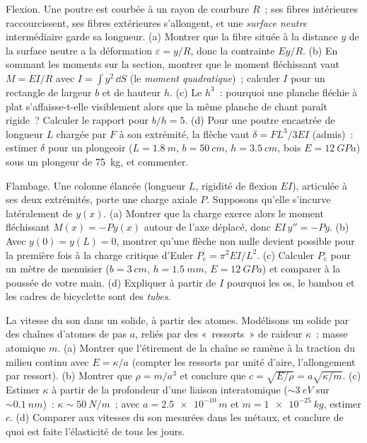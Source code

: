 \begin{exercise}[$\star\star\star$]\label{exo:b3:continuum-elasticity:10}
Flexion. Une poutre est courbée à un rayon de courbure $R$~; ses fibres
intérieures raccourcissent, ses fibres extérieures s'allongent, et une
\emph{surface neutre} intermédiaire garde sa longueur. (a) Montrer que
la fibre située à la distance $y$ de la surface neutre a la déformation
$\varepsilon = y/R$, donc la contrainte $Ey/R$. (b) En sommant les
moments sur la section, montrer que le moment fléchissant vaut
$M = EI/R$ avec $I = \int y^2\,\dd S$ (le \emph{moment quadratique})~;
calculer $I$ pour un rectangle de largeur $b$ et de hauteur $h$. (c) Le
$h^3$~: pourquoi une planche fléchie à plat s'affaisse-t-elle
visiblement alors que la même planche de chant paraît rigide~?
Calculer le rapport pour $b/h = 5$. (d) Pour une poutre encastrée de
longueur $L$ chargée par $F$ à son extrémité, la flèche vaut
$\delta = FL^3/3EI$ (admis)~: estimer $\delta$ pour un plongeoir
($L = \qty{1.8}{m}$, $b = \qty{50}{cm}$, $h = \qty{3.5}{cm}$, bois $E
= \qty{12}{GPa}$) sous un plongeur de \qty{75}{kg}, et commenter.
\end{exercise}

\begin{exercise}[$\star\star\star$]\label{exo:b3:continuum-elasticity:11}
Flambage. Une colonne élancée (longueur $L$, rigidité de flexion $EI$),
articulée à ses deux extrémités, porte une charge axiale $P$. Supposons
qu'elle s'incurve latéralement de $y(x)$. (a) Montrer que la charge
exerce alors le moment fléchissant $M(x) = -Py(x)$ autour de l'axe
déplacé, donc $EI\,y'' = -Py$. (b) Avec $y(0) = y(L) = 0$, montrer
qu'une flèche non nulle devient possible pour la première fois à la
charge critique d'Euler $P_{\text{c}} = \pi^2EI/L^2$. (c) Calculer
$P_{\text{c}}$ pour un mètre de menuisier ($b = \qty{3}{cm}$, $h = \qty{1.5}{mm}$, $E = \qty{12}{GPa}$) et
comparer à la poussée de votre main. (d) Expliquer à partir de $I$
pourquoi les os, le bambou et les cadres de bicyclette sont des
\emph{tubes}.
\end{exercise}

\begin{exercise}[$\star\star\star$]\label{exo:b3:continuum-elasticity:12}
La vitesse du son dans un solide, à partir des atomes. Modélisons un
solide par des chaînes d'atomes de pas $a$, reliés par des «~ressorts~»
de raideur $\kappa$~; masse atomique $m$. (a) Montrer que l'étirement
de la chaîne se ramène à la traction du milieu continu avec $E = \kappa/a$ (compter les ressorts
par unité d'aire, l'allongement par ressort). (b) Montrer que
$\rho = m/a^3$ et conclure que $c =
\sqrt{E/\rho} = a\sqrt{\kappa/m}$. (c) Estimer $\kappa$ à partir de la
profondeur d'une liaison interatomique ($\sim\qty{3}{eV}$ sur $\sim
\qty{0.1}{nm}$)~: $\kappa \sim \qty{50}{N/m}$~; avec $a =
\qty{2.5e-10}{m}$ et $m = \qty{1e-25}{kg}$, estimer $c$. (d) Comparer
aux vitesses du son mesurées dans les métaux, et conclure de quoi est
faite l'élasticité de tous les jours.
\end{exercise}

